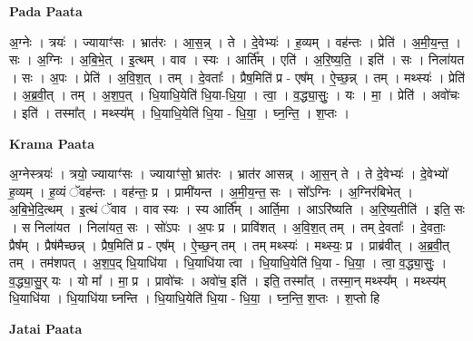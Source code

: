 \documentclass[17pt]{extarticle}
\begin{document}
\textbf{Pada Paata} \newline

अ॒ग्नेः । त्रयः॑ । ज्यायाꣳ॑सः । भ्रात॑रः । आ॒स॒न्न् । ते । दे॒वेभ्यः॑ । ह॒व्यम् । वह॑न्तः । प्रेति॑ । अ॒मी॒य॒न्त॒ । सः । अ॒ग्निः । अ॒बि॒भे॒त् । इ॒त्थम् । वाव । स्यः । आर्ति᳚म् । एति॑ । अ॒रि॒ष्य॒ति॒ । इति॑ । सः । निला॑यत । सः । अ॒पः । प्रेति॑ । अ॒वि॒श॒त् । तम् । दे॒वताः᳚ । प्रैष॒मिति॑ प्र - एष᳚म् । ऐ॒च्छ॒न्न् । तम् । मथ्स्यः॑ । प्रेति॑ । अ॒ब्र॒वी॒त् । तम् । अ॒श॒प॒त् । धि॒याधि॒येति॑ धि॒या-धि॒या॒ । त्वा॒ । व॒द्ध्या॒सुः॒ । यः । मा॒ । प्रेति॑ । अवो॑चः । इति॑ । तस्मा᳚त् । मथ्स्य᳚म् । धि॒याधि॒येति॑ धि॒या - धि॒या॒ । घ्न॒न्ति॒ । श॒प्तः ।  \newline


\textbf{Krama Paata} \newline

अ॒ग्नेस्त्रयः॑ । त्रयो॒ ज्यायाꣳ॑सः । ज्यायाꣳ॑सो॒ भ्रात॑रः । भ्रात॑र आसन्न् । आ॒स॒न् ते । ते दे॒वेभ्यः॑ । दे॒वेभ्यो॑ ह॒व्यम् । ह॒व्यं ॅवह॑न्तः । वह॑न्तः॒ प्र । प्रामी॑यन्त । अ॒मी॒य॒न्त॒ सः । सो᳚ऽग्निः । अ॒ग्निर॑बिभेत् । अ॒बि॒भे॒दि॒त्थम् । इ॒त्थं ॅवाव । वाव स्यः । स्य आर्ति᳚म् । आर्ति॒मा । आऽरि॑ष्यति । अ॒रि॒ष्य॒तीति॑ । इति॒ सः । स निला॑यत । निला॑यत॒ सः । सो॑ऽपः । अ॒पः प्र । प्रावि॑शत् । अ॒वि॒श॒त् तम् । तम् दे॒वताः᳚ । दे॒वताः॒ प्रैष᳚म् । प्रैष॑मैच्छन्न् । प्रैष॒मिति॑ प्र - एष᳚म् । ऐ॒च्छ॒न् तम् । तम् मथ्स्यः॑ । मथ्स्यः॒ प्र । प्राब्र॑वीत् । अ॒ब्र॒वी॒त् तम् । तम॑शपत् । अ॒श॒प॒द् धि॒याधि॑या । धि॒याधि॑या त्वा । धि॒याधि॒येति॑ धि॒या - धि॒या॒ । त्वा॒ व॒द्ध्या॒सुः॒ । व॒द्ध्या॒सु॒र् यः । यो मा᳚ । मा॒ प्र । प्रावो॑चः । अवो॑च॒ इति॑ । इति॒ तस्मा᳚त् । तस्मा॒न् मथ्स्य᳚म् । मथ्स्य॑म् धि॒याधि॑या । धि॒याधि॑या घ्नन्ति । धि॒याधि॒येति॑ धि॒या - धि॒या॒ । घ्न॒न्ति॒ श॒प्तः । श॒प्तो हि \newline

\textbf{Jatai Paata} \newline
\end{document}
